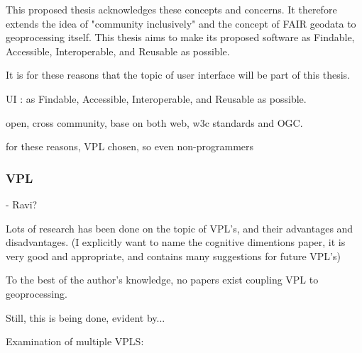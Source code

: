 This proposed thesis acknowledges these concepts and concerns. 
It therefore extends the idea of "community inclusively" and the concept of FAIR geodata to geoprocessing itself. 
This thesis aims to make its proposed software as Findable, Accessible, Interoperable, and Reusable as possible. 

It is for these reasons that the topic of user interface will be part of this thesis. 

UI : as Findable, Accessible, Interoperable, and Reusable as possible. 

open, cross community, base on both web, w3c standards and OGC.

for these reasons, VPL chosen, so even non-programmers



\subsubsection*{VPL}

- Ravi?

Lots of research has been done on the topic of VPL's, and their advantages and disadvantages. 
(I explicitly want to name the cognitive dimentions paper, it is very good and appropriate, and contains many suggestions for future VPL's)








To the best of the author's knowledge, no papers exist coupling VPL to geoprocessing.

Still, this is being done, evident by...


Examination of multiple VPLS:






